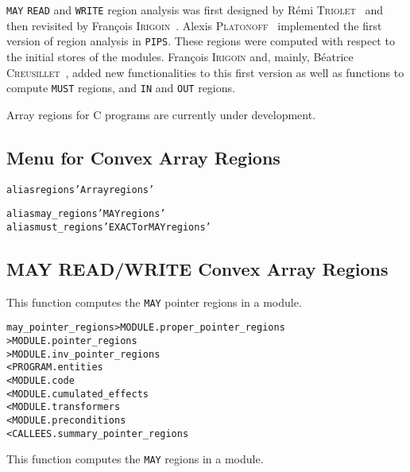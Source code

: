 \documentclass[a4paper]{report}
\newenvironment{PipsMake}{\begin{alltt}}{\end{alltt}}
\newenvironment{PipsPass}[1]{\label{pass:#1}}{}
\newcommand{\Pips}{\texttt{PIPS}}
\begin{document}
\begin{PipsPass}{regions}
\verb+MAY+ \verb+READ+ and \verb+WRITE+ region analysis was first designed
by R\'emi \textsc{Triolet}~\cite{Tri84} and then revisited by Fran\c{c}ois
\textsc{Irigoin}~\cite{TIF86}. Alexis \textsc{Platonoff}~\cite{Pla90}
implemented the first version of region analysis in \Pips{}. These
regions were computed with respect to the initial stores of the
modules. Fran\c{c}ois \textsc{Irigoin} and, mainly, B\'eatrice
\textsc{Creusillet}~\cite{CI95,CI96,Cre96}, added new functionalities to
this first version as well as functions to compute \verb+MUST+
regions, and \verb+IN+ and \verb+OUT+ regions.

Array regions for C programs are currently under development.


\end{PipsPass}

\subsection{Menu for Convex Array Regions}

\begin{PipsMake}
alias regions 'Array regions'

alias may_regions 'MAY regions'
alias must_regions 'EXACT or MAY regions'
\end{PipsMake}

\subsection{MAY READ/WRITE Convex Array Regions}
\label{subsubsection-may-regions}

\begin{PipsPass}{may_pointer_regions}
This function computes the \verb|MAY| pointer regions in a module.
\end{PipsPass}
\begin{PipsMake}
may_pointer_regions             > MODULE.proper_pointer_regions
                                > MODULE.pointer_regions
                                > MODULE.inv_pointer_regions
        < PROGRAM.entities
        < MODULE.code
        < MODULE.cumulated_effects
        < MODULE.transformers
        < MODULE.preconditions
        < CALLEES.summary_pointer_regions
\end{PipsMake}

\begin{PipsPass}{may_regions}
This function computes the \verb|MAY| regions in a module.
\end{PipsPass}
\end{document}
